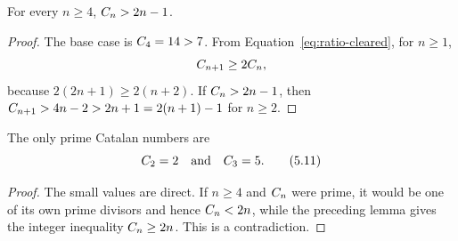 \begin{lemma}
For every $n\ge4$, $C_n>2n-1$.
\end{lemma}

\begin{proof}
The base case is $C_4=14>7$.  From
Equation~\eqref{eq:ratio-cleared}, for $n\ge1$,
\[
 C_{n+1}\ge2C_n,
\]
because $2(2n+1)\ge2(n+2)$.  If $C_n>2n-1$, then
$C_{n+1}>4n-2>2n+1=2(n+1)-1$ for $n\ge2$.
\end{proof}

\begin{theorem}
The only prime Catalan numbers are
\[
 C_2=2\quad\text{and}\quad C_3=5.                          \tag{5.11}
\]
\end{theorem}

\begin{proof}
The small values are direct.  If $n\ge4$ and $C_n$ were prime, it would be
one of its own prime divisors and hence $C_n<2n$, while the preceding lemma
gives the integer inequality $C_n\ge2n$.  This is a contradiction.
\end{proof}
